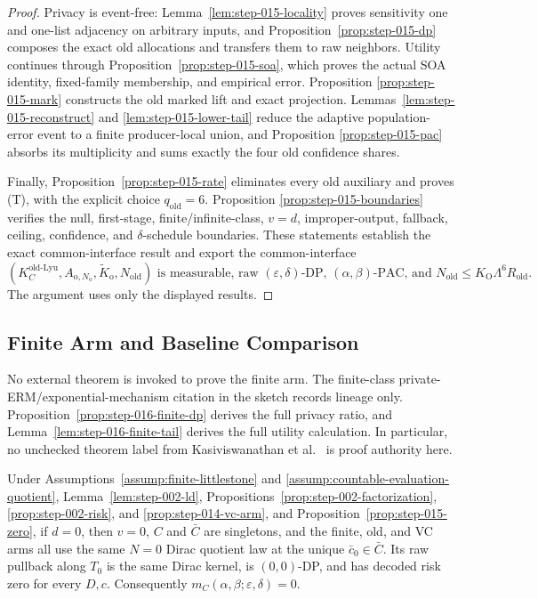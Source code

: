 \begin{proof}
Privacy is event-free: Lemma~\ref{lem:step-015-locality} proves
sensitivity one and one-list adjacency on arbitrary inputs, and
Proposition~\ref{prop:step-015-dp} composes the exact old allocations and
transfers them to raw neighbors. Utility continues through
Proposition~\ref{prop:step-015-soa}, which proves the actual SOA identity,
fixed-family membership, and empirical error. Proposition
\ref{prop:step-015-mark} constructs the old marked lift and exact
projection. Lemmas~\ref{lem:step-015-reconstruct} and
\ref{lem:step-015-lower-tail} reduce the adaptive population-error event to
a finite producer-local union, and Proposition
\ref{prop:step-015-pac} absorbs its multiplicity and sums exactly the four
old confidence shares.

Finally, Proposition~\ref{prop:step-015-rate} eliminates every old
auxiliary and proves (T), with the explicit choice
\(q_{\mathrm{old}}=6\). Proposition
\ref{prop:step-015-boundaries} verifies the null, first-stage,
finite/infinite-class, \(v=d\), improper-output, fallback, ceiling,
confidence, and \(\delta\)-schedule boundaries. These statements establish
the exact common-interface result and export the common-interface
\[
\boxed{
(K_C^{\mathrm{old\text{-}Lyu}},
A_{\mathrm o,N_{\mathrm o}},
\widetilde K_{\mathrm o},
N_{\mathrm{old}})
\text{ is measurable, raw }(\varepsilon,\delta)\text{-DP, }
(\alpha,\beta)\text{-PAC, and }
N_{\mathrm{old}}\le K_{\mathrm O}\Lambda^6R_{\mathrm{old}}.}
\]
The argument uses only the displayed results.



\end{proof}

\subsection{Finite Arm and Baseline Comparison}\label{app:step_016}


No external theorem is invoked to prove the finite arm. The finite-class
private-ERM/exponential-mechanism citation in the  sketch records
lineage only. Proposition~\ref{prop:step-016-finite-dp} derives the full
privacy ratio, and Lemma~\ref{lem:step-016-finite-tail} derives the full
utility calculation. In particular, no unchecked theorem label from
Kasiviswanathan et al.~\citep{kasiviswanathan2008} is proof authority here.

 \begin{proposition}\label{prop:step-016-zero}
Under Assumptions~\ref{assump:finite-littlestone} and
\ref{assump:countable-evaluation-quotient}, Lemma~\ref{lem:step-002-ld}, 
Propositions~\ref{prop:step-002-factorization},
\ref{prop:step-002-risk}, and
\ref{prop:step-014-vc-arm}, and Proposition~\ref{prop:step-015-zero}, if \(d=0\), then \(v=0\),
\(C\) and \(\bar C\) are singletons, and the finite, old, and VC arms all
use the same \(N=0\) Dirac quotient law at the unique
\(\bar c_0\in\bar C\). Its raw pullback along \(T_0\) is the same Dirac
kernel, is \((0,0)\)-DP, and has decoded risk zero for every \(D,c\).
Consequently \(m_C(\alpha,\beta;\varepsilon,\delta)=0\).


\end{proposition}

